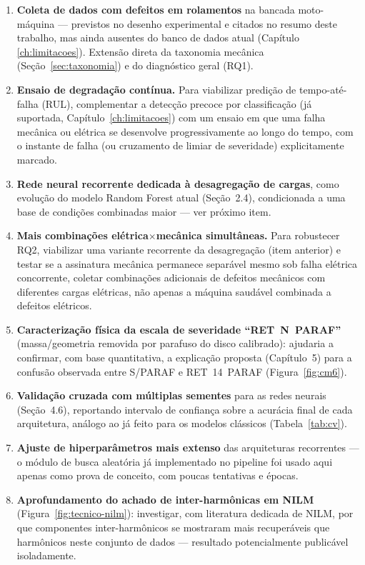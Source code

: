\documentclass[12pt,a4paper]{report}
\begin{document}
\begin{enumerate}
\item \textbf{Coleta de dados com defeitos em rolamentos} na bancada
moto-máquina — previstos no desenho experimental e citados no resumo deste
trabalho, mas ainda ausentes do banco de dados atual (Capítulo~
\ref{ch:limitacoes}). Extensão direta da taxonomia mecânica
(Seção~\ref{sec:taxonomia}) e do diagnóstico geral (RQ1).
\item \textbf{Ensaio de degradação contínua.} Para viabilizar predição de
tempo-até-falha (RUL), complementar a detecção precoce por classificação
(já suportada, Capítulo~\ref{ch:limitacoes}) com um ensaio em que uma falha
mecânica ou elétrica se desenvolve progressivamente ao longo do tempo, com o
instante de falha (ou cruzamento de limiar de severidade) explicitamente
marcado.
\item \textbf{Rede neural recorrente dedicada à desagregação de cargas},
como evolução do modelo Random Forest atual (Seção~2.4), condicionada a uma
base de condições combinadas maior — ver próximo item.
\item \textbf{Mais combinações elétrica$\times$mecânica simultâneas.} Para
robustecer RQ2, viabilizar uma variante recorrente da desagregação (item
anterior) e testar se a assinatura mecânica permanece separável mesmo sob
falha elétrica concorrente, coletar combinações adicionais de defeitos
mecânicos com diferentes cargas elétricas, não apenas a máquina saudável
combinada a defeitos elétricos.
\item \textbf{Caracterização física da escala de severidade
``RET~N~PARAF''} (massa/geometria removida por parafuso do disco calibrado):
ajudaria a confirmar, com base quantitativa, a explicação proposta
(Capítulo~5) para a confusão observada entre S/PARAF e RET~14~PARAF
(Figura~\ref{fig:cm6}).
\item \textbf{Validação cruzada com múltiplas sementes} para as redes
neurais (Seção~4.6), reportando intervalo de confiança sobre a acurácia
final de cada arquitetura, análogo ao já feito para os modelos clássicos
(Tabela~\ref{tab:cv}).
\item \textbf{Ajuste de hiperparâmetros mais extenso} das arquiteturas
recorrentes — o módulo de busca aleatória já implementado no pipeline foi
usado aqui apenas como prova de conceito, com poucas tentativas e épocas.
\item \textbf{Aprofundamento do achado de inter-harmônicas em NILM}
(Figura~\ref{fig:tecnico-nilm}): investigar, com literatura dedicada de
NILM, por que componentes inter-harmônicos se mostraram mais recuperáveis
que harmônicos neste conjunto de dados — resultado potencialmente
publicável isoladamente.
\end{enumerate}
\end{document}
